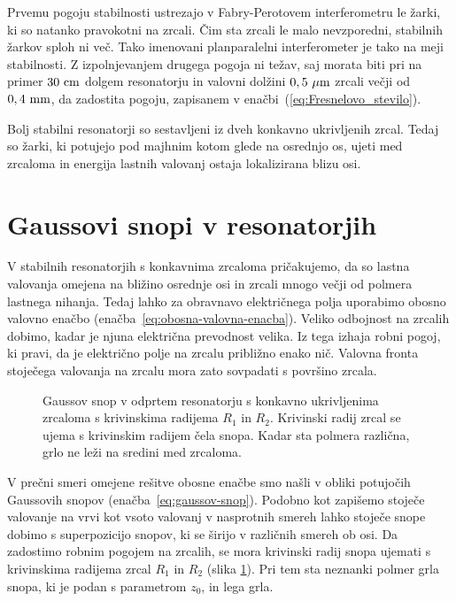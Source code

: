 Prvemu pogoju stabilnosti ustrezajo v Fabry-Perotovem interferometru
le žarki, ki so natanko pravokotni na zrcali. Čim sta zrcali le
malo nevzporedni, stabilnih žarkov sploh ni več. Tako imenovani planparalelni 
interferometer je tako na meji stabilnosti. Z izpolnjevanjem drugega
pogoja ni težav, saj morata biti pri na primer $30~\centi\metre$ dolgem resonatorju in 
valovni dolžini $0,5~\mu\metre$ zrcali večji od $0,4~\milli\metre$, da zadostita pogoju, 
zapisanem v enačbi~(\ref{eq:Fresnelovo_stevilo}).

Bolj stabilni resonatorji so sestavljeni iz dveh konkavno ukrivljenih
zrcal. Tedaj so žarki, ki potujejo pod majhnim kotom glede na osrednjo os, ujeti
med zrcaloma in energija lastnih valovanj ostaja lokalizirana blizu
osi.

\section{Gaussovi snopi v resonatorjih}
V stabilnih resonatorjih s konkavnima zrcaloma pričakujemo, da so
lastna valovanja omejena na bližino osrednje osi in zrcali mnogo 
večji od polmera lastnega nihanja. Tedaj lahko za obravnavo
električnega polja uporabimo obosno valovno enačbo (enačba~\ref{eq:obosna-valovna-enacba}). 
Veliko odbojnost na zrcalih dobimo, kadar je njuna električna prevodnost velika. 
Iz tega izhaja robni pogoj, ki pravi, da je električno polje na zrcalu 
približno enako nič. Valovna fronta stoječega valovanja na zrcalu mora zato 
sovpadati s površino zrcala.

\begin{figure}[h]
\centering
\def\svgwidth{100truemm} 

\caption{Gaussov snop v odprtem resonatorju s konkavno ukrivljenima zrcaloma
s krivinskima radijema $R_1$ in $R_2$. 
Krivinski radij zrcal se ujema s krivinskim radijem čela snopa. Kadar sta polmera
različna, grlo ne leži na sredini med zrcaloma.}
\label{fig:Gaussov-snop-v-resonatorju}
\end{figure}

V prečni smeri omejene rešitve obosne enačbe smo našli v obliki potujočih
Gaussovih snopov (enačba~\ref{eq:gaussov-snop}). Podobno kot zapišemo stoječe valovanje na vrvi kot
vsoto valovanj v nasprotnih smereh
lahko stoječe snope dobimo s superpozicijo snopov, ki se širijo v različnih smereh ob osi. 
Da zadostimo robnim pogojem na zrcalih, se mora krivinski radij snopa ujemati s
krivinskima radijema zrcal $R_{1}$ in $R_{2}$ (slika \ref{fig:Gaussov-snop-v-resonatorju}).
Pri tem sta neznanki polmer grla snopa, ki je podan s parametrom $z_{0}$,
in lega grla. 


